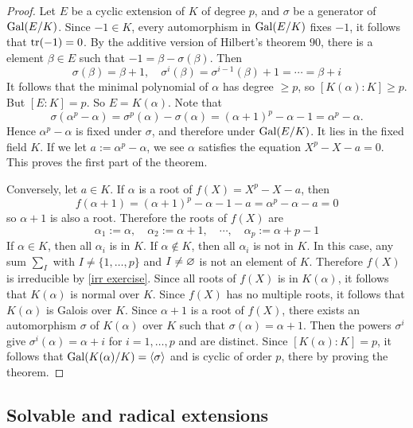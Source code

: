 \begin{proof}
Let $E$ be a cyclic extension of $K$ of degree $p$, and $\sigma$ be a generator of $\mathrm{Gal}(E/K)$. Since $-1\in K$, every automorphism in $\mathrm{Gal}(E/K)$ fixes $-1$, it follows that $\mathrm{tr}(-1)=0$. By the additive version of Hilbert's theorem $90$, there is a element $\beta\in E$ such that $-1=\beta-\sigma(\beta)$. Then
\[\sigma(\beta)=\beta+1,\quad\sigma^i(\beta)=\sigma^{i-1}(\beta)+1=\cdots=\beta+i\]
It follows that the minimal polynomial of $\alpha$ has degree $\geq p$, so $[K(\alpha):K]\geq p$. But $[E:K]=p$. So $E=K(\alpha)$. Note that
\[\sigma(\alpha^p-\alpha)=\sigma^p(\alpha)-\sigma(\alpha)=(\alpha+1)^p-\alpha-1=\alpha^p-\alpha.\]
Hence $\alpha^p-\alpha$ is fixed under $\sigma$, and therefore under $\mathrm{Gal}(E/K)$. It lies in the fixed field $K$. If we let $a:=\alpha^p-\alpha$, we see $\alpha$ satisfies the equation $X^p-X-a=0$. This proves the first part of the theorem.\par
Conversely, let $a\in K$. If $\alpha$ is a root of $f(X)=X^p-X-a$, then
\[f(\alpha+1)=(\alpha+1)^p-\alpha-1-a=\alpha^p-\alpha-a=0\]
so $\alpha+1$ is also a root. Therefore the roots of $f(X)$ are 
\[\alpha_1:=\alpha,\quad\alpha_2:=\alpha+1,\quad\cdots,\quad\alpha_p:=\alpha+p-1\]
If $\alpha\in K$, then all $\alpha_i$ is in $K$. If $\alpha\notin K$, then all $\alpha_i$ is not in $K$. In this case, any sum $\sum_I$ with $I\neq\{1,\dots,p\}$ and $I\neq\varnothing$ is not an element of $K$. Therefore $f(X)$ is irreducible by \cref{irr exercise}. Since all roots of $f(X)$ is in $K(\alpha)$, it follows that $K(\alpha)$ is normal over $K$. Since $f(X)$ has no multiple roots, it follows that $K(\alpha)$ is Galois over $K$. Since $\alpha+1$ is a root of $f(X)$, there exists an automorphism $\sigma$ of $K(\alpha)$ over $K$ such that $\sigma(\alpha)=\alpha+1$. Then the powers $\sigma^i$ give $\sigma^i(\alpha)=\alpha+i$ for $i=1,\dots,p$ and are distinct. Since $[K(\alpha):K]=p$, it follows that $\mathrm{Gal}(K(\alpha)/K)=\langle\sigma\rangle$ and is cyclic of order $p$, there by proving the theorem.
\end{proof}
\subsection{Solvable and radical extensions}
